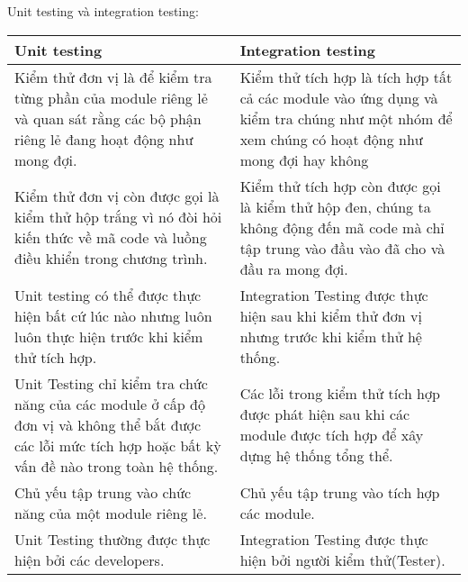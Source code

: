 Unit testing và integration testing:

\begin{table}[H]
	\centering
	\begin{tabular}{|p{8cm}|p{8cm}|}
		\hline
		\textbf{Unit testing}                                                                                                                                     & \textbf{Integration testing}                                                                                                                 \\ \hline
		Kiểm thử đơn vị là để kiểm tra từng phần của module riêng lẻ và quan sát rằng các bộ phận riêng lẻ đang hoạt động như mong đợi.                           & Kiểm thử tích hợp là tích hợp tất cả các module vào ứng dụng và kiểm tra chúng như một nhóm để xem chúng có hoạt động như mong đợi hay không \\ \hline
		Kiểm thử đơn vị còn được gọi là kiểm thử hộp trắng vì nó đòi hỏi kiến thức về mã code và luồng điều khiển trong chương trình.                             & Kiểm thử tích hợp còn được gọi là kiểm thử hộp đen, chúng ta không động đến mã code mà chỉ tập trung vào đầu vào đã cho và đầu ra mong đợi.  \\ \hline
		Unit testing có thể được thực hiện bất cứ lúc nào nhưng luôn luôn thực hiện trước khi kiểm thử tích hợp.                                                  & Integration Testing được thực hiện sau khi kiểm thử đơn vị nhưng trước khi kiểm thử hệ thống.                                                \\ \hline
		Unit Testing chỉ kiểm tra chức năng của các module ở cấp độ đơn vị và không thể bắt được các lỗi mức tích hợp hoặc bất kỳ vấn đề nào trong toàn hệ thống. & Các lỗi trong kiểm thử tích hợp được phát hiện sau khi các module được tích hợp để xây dựng hệ thống tổng thể.                               \\ \hline
		Chủ yếu tập trung vào chức năng của một module riêng lẻ.                                                                                                  & Chủ yếu tập trung vào tích hợp các module.                                                                                                   \\ \hline
		Unit Testing thường được thực hiện bởi các developers.                                                                                                    & Integration Testing được thực hiện bởi người kiểm thử(Tester).                                                                               \\ \hline

\end{tabular}
\end{table}
